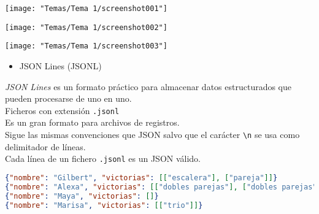 \begin{center}
	\texttt{[image: "Temas/Tema 1/screenshot001"]}
	
	\texttt{[image: "Temas/Tema 1/screenshot002"]}
	
	\texttt{[image: "Temas/Tema 1/screenshot003"]}
\end{center}
\begin{itemize}[label=\color{red}\textbullet, leftmargin=*]
	\item \color{lightblue}JSON Lines (JSONL)
\end{itemize}
\textit{JSON Lines} es un formato práctico para almacenar datos estructurados que pueden procesarse de uno en uno.\\
Ficheros con extensión \texttt{.jsonl}\\
Es un gran formato para archivos de registros.\\
Sigue las mismas convenciones que JSON salvo que el carácter \texttt{\textbackslash n} se usa como delimitador de líneas.\\
Cada línea de un fichero \texttt{.jsonl} es un JSON válido.

\begin{lstlisting}[language=json]
{"nombre": "Gilbert", "victorias": [["escalera"], ["pareja"]]}
{"nombre": "Alexa", "victorias": [["dobles parejas"], ["dobles parejas"]]}
{"nombre": "Maya", "victorias": []}
{"nombre": "Marisa", "victorias": [["trio"]]}
\end{lstlisting}

